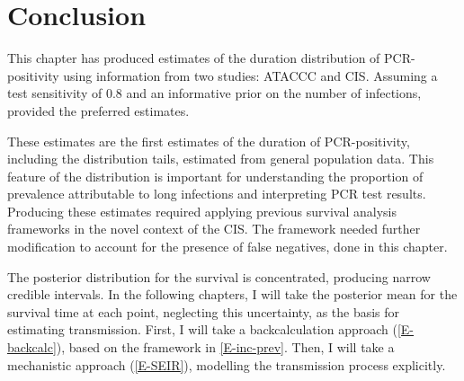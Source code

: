\documentclass[thesis.tex]{subfiles}
\begin{document}
\section{Conclusion} \label{imperf-test:sec:conclusion}

This chapter has produced estimates of the duration distribution of PCR-positivity using information from two studies: ATACCC and CIS.
Assuming a test sensitivity of 0.8 and an informative prior on the number of infections, provided the preferred estimates.

These estimates are the first estimates of the duration of PCR-positivity, including the distribution tails, estimated from general population data.
This feature of the distribution is important for understanding the proportion of prevalence attributable to long infections and interpreting PCR test results.
Producing these estimates required applying previous survival analysis frameworks in the novel context of the CIS.
The framework needed further modification to account for the presence of false negatives, done in this chapter.

The posterior distribution for the survival is concentrated, producing narrow credible intervals.
In the following chapters, I will take the posterior mean for the survival time at each point, neglecting this uncertainty, as the basis for estimating transmission.
First, I will take a backcalculation approach (\cref{E-backcalc}), based on the framework in \cref{E-inc-prev}.
Then, I will take a mechanistic approach (\cref{E-SEIR}), modelling the transmission process explicitly.

\ifSubfilesClassLoaded{
  \listoftodos
}{}
\end{document}
